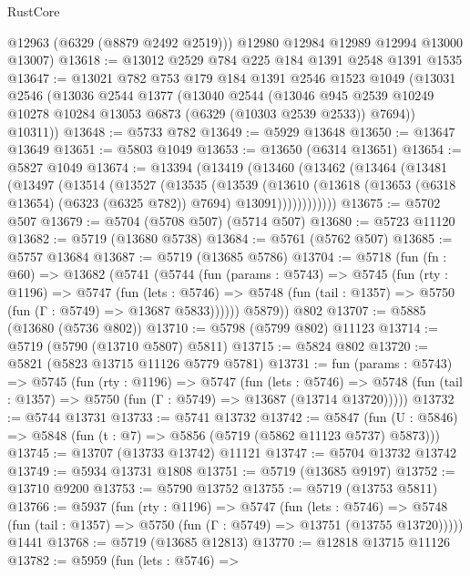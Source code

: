 \begin{lexlean}{RustCore}
\begin{coremodule}
        @12963
        (@6329 (@8879 @2492 @2519)))
      @12980
      @12984
      @12989
      @12994
      @13000
      @13007)
@13618 := @13012 @2529 @784 @225 @184 @1391 @2548 @1391 @1535
@13647 := @13021
    @782
    @753
    @179
    @184
    @1391
    @2546
    @1523
    @1049
    (@13031
      @2546
      (@13036
        @2544
        @1377
        (@13040
          @2544
          (@13046 @945 @2539 @10249 @10278 @10284 @13053 @6873 (@6329 (@10303 @2539 @2533)) @7694))
        @10311))
@13648 := @5733 @782
@13649 := @5929 @13648
@13650 := @13647 @13649
@13651 := @5803 @1049
@13653 := @13650 (@6314 @13651)
@13654 := @5827 @1049
@13674 := @13394
    (@13419
      (@13460
        (@13462
          (@13464
            (@13481
              (@13497
                (@13514
                  (@13527
                    (@13535
                      (@13539
                        (@13610
                          (@13618
                            (@13653 (@6318 @13654) (@6323 (@6325 @782)) @7694)
                            @13091))))))))))))
@13675 := @5702 @507
@13679 := @5704 (@5708 @507) (@5714 @507)
@13680 := @5723 @11120
@13682 := @5719 (@13680 @5738)
@13684 := @5761 (@5762 @507)
@13685 := @5757 @13684
@13687 := @5719 (@13685 @5786)
@13704 := @5718
    (fun (fn : @60) =>
    @13682
      (@5741
        (@5744
          (fun (params : @5743) =>
          @5745
            (fun (rty : @1196) =>
            @5747
              (fun (lets : @5746) =>
              @5748 (fun (tail : @1357) => @5750 (fun (Γ : @5749) => @13687 @5833))))))
        @5879))
    @802
@13707 := @5885 (@13680 (@5736 @802))
@13710 := @5798 (@5799 @802) @11123
@13714 := @5719 (@5790 (@13710 @5807) @5811)
@13715 := @5824 @802
@13720 := @5821 (@5823 @13715 @11126 @5779 @5781)
@13731 := fun (params : @5743) =>
  @5745
    (fun (rty : @1196) =>
    @5747
      (fun (lets : @5746) =>
      @5748 (fun (tail : @1357) => @5750 (fun (Γ : @5749) => @13687 (@13714 @13720)))))
@13732 := @5744 @13731
@13733 := @5741 @13732
@13742 := @5847
    (fun (U : @5846) => @5848 (fun (t : @7) => @5856 (@5719 (@5862 @11123 @5737) @5873)))
@13745 := @13707 (@13733 @13742) @11121
@13747 := @5704 @13732 @13742
@13749 := @5934 @13731 @1808
@13751 := @5719 (@13685 @9197)
@13752 := @13710 @9200
@13753 := @5790 @13752
@13755 := @5719 (@13753 @5811)
@13766 := @5937
    (fun (rty : @1196) =>
    @5747
      (fun (lets : @5746) =>
      @5748 (fun (tail : @1357) => @5750 (fun (Γ : @5749) => @13751 (@13755 @13720)))))
    @1441
@13768 := @5719 (@13685 @12813)
@13770 := @12818 @13715 @11126
@13782 := @5959
    (fun (lets : @5746) =>

\end{coremodule}
\end{lexlean}
